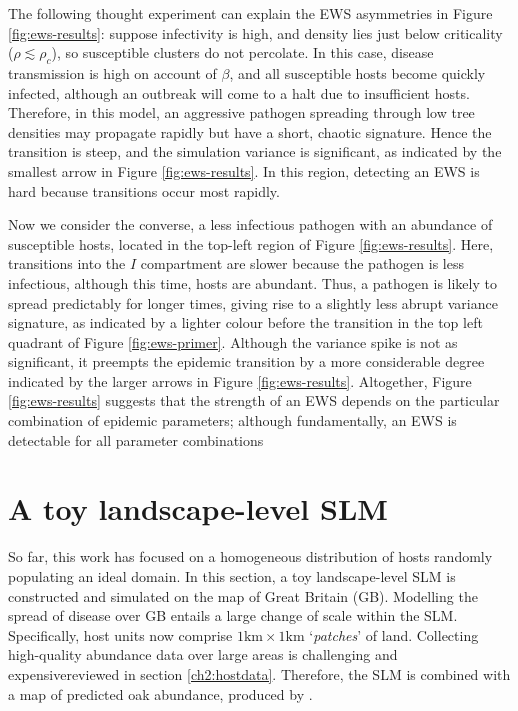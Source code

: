 The following thought experiment can explain the EWS asymmetries in Figure \ref{fig:ews-results}: %
suppose infectivity is high, and density lies just below criticality ($\rho\lesssim\rho_c$), 
so susceptible clusters do not percolate. 
In this case, disease transmission is high on account of $\beta$, 
and all susceptible hosts become quickly infected, 
although an outbreak will come to a halt due to insufficient hosts. Therefore, in this model, 
an aggressive pathogen spreading through low tree densities may propagate rapidly but have a short, 
chaotic signature. Hence the transition is steep,
and the simulation variance is significant, as indicated by the smallest arrow in Figure \ref{fig:ews-results}. 
In this region, detecting an EWS is hard because transitions occur most rapidly.

Now we consider the converse, a less infectious pathogen with an abundance of susceptible hosts, 
located in the top-left region of Figure \ref{fig:ews-results}.
Here, transitions into the $I$ compartment are slower because the pathogen is less infectious, 
although this time, hosts are abundant.
Thus, a pathogen is likely to spread predictably for longer times, 
giving rise to a slightly less abrupt variance signature, 
as indicated by a lighter colour before the transition in the top left quadrant of Figure \ref{fig:ews-primer}.
Although the variance spike is not as significant, 
it preempts the epidemic transition by a more considerable degree\textemdash
indicated by the larger arrows in Figure \ref{fig:ews-results}.
Altogether, Figure \ref{fig:ews-results} suggests that the strength of an EWS depends on the particular combination of epidemic parameters; 
although fundamentally, an EWS is detectable for all parameter combinations
\newpage

\section{A toy landscape-level SLM}

So far, this work has focused on a homogeneous distribution of hosts randomly populating an ideal domain. 
In this section, a toy landscape-level SLM is constructed and simulated on the map of Great Britain (GB).
Modelling the spread of disease over GB entails a large change of scale within the SLM. 
Specifically, host units now comprise $\mathrm{1km \times 1km}$ `\textit{patches}' of land. 
Collecting high-quality abundance data over large areas is challenging and expensive\textemdash reviewed in section \ref{ch2:hostdata}.
Therefore, the SLM is combined with a map of predicted oak abundance, produced by \cite{hill.data}.


